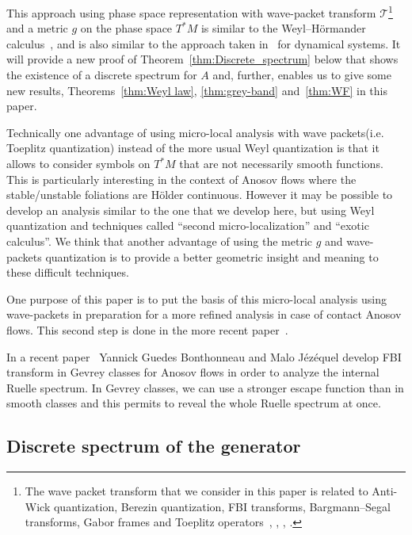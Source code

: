 \documentclass[AHL,Unicode,longabstracts,published]{cedram}
\newcommand{\clT}{\mathcal{T}}
\begin{document}
This approach using phase space representation with wave-packet transform $\clT$\footnote{The wave packet transform that we consider in this paper is related to Anti-Wick quantization, Berezin quantization, FBI transforms, Bargmann--Segal transforms, Gabor frames and Toeplitz operators~\cite[Chap.~3]{martinez-01}, \cite{wunsh-zworski_01}, \cite[Chap.~13]{zworski_book_2012}, \cite{sjostrand_hitrick_07,sjostrand_density_resonances_96}.} and a metric $g$ on the phase space $T^{*}M$ is similar to the Weyl--H\"ormander calculus~\cite{hormander1979weyl}, \cite[Section~2.2]{lerner2011metrics} and is also similar to the approach taken in~\cite{faure-tsujii_prequantum_maps_12,faure-tsujii_anosov_flows_13,tsujii_08,tsujii_FBI_10} for dynamical systems. It will provide a new proof of Theorem~\ref{thm:Discrete_spectrum} below that shows the existence of a discrete spectrum for $A$ and, further, enables us to give some new results, Theorems~\ref{thm:Weyl law}, \ref{thm:grey-band} and~\ref{thm:WF} in this paper.

Technically one advantage of using micro-local analysis with wave packets\linebreak (i.e. Toeplitz quantization) instead of the more usual Weyl quantization is that it allows to consider symbols on $T^{*}M$ that are not necessarily smooth functions. This is particularly interesting in the context of Anosov flows where the stable/unstable foliations are H\"older continuous. However it may be possible to develop an analysis similar to the one that we develop here, but using Weyl quantization and techniques called ``second micro-localization'' and ``exotic calculus''. We think that another advantage of using the metric $g$ and wave-packets quantization is to provide a better geometric insight and meaning to these difficult techniques.

One purpose of this paper is to put the basis of this micro-local analysis using wave-packets in preparation for a more refined analysis in case of contact Anosov flows. This second step is done in the more recent paper~\cite{faure-tsujii_anosov_flows_16}.

In a recent paper~\cite{bonthonneau2020fbi} Yannick Guedes Bonthonneau and Malo Jézéquel develop FBI transform in Gevrey classes for Anosov flows in order to analyze the internal Ruelle spectrum. In Gevrey classes, we can use a stronger escape function than in smooth classes and this permits to reveal the whole Ruelle spectrum at once.

\subsection*{Discrete spectrum of the generator}
\end{document}
